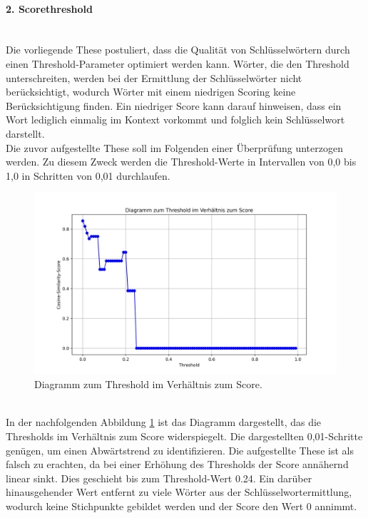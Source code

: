 \paragraph{2. Scorethreshold}\mbox{}\\
Die vorliegende These postuliert, dass die Qualität von Schlüsselwörtern durch einen Threshold-Parameter optimiert werden kann. Wörter, die den Threshold unterschreiten, werden bei der Ermittlung der Schlüsselwörter nicht berücksichtigt, wodurch Wörter mit einem niedrigen Scoring keine Berücksichtigung finden. Ein niedriger Score kann darauf hinweisen, dass ein Wort lediglich einmalig im Kontext vorkommt und folglich kein Schlüsselwort darstellt.\\

Die zuvor aufgestellte These soll im Folgenden einer Überprüfung unterzogen werden. Zu diesem Zweck werden die Threshold-Werte in Intervallen von 0,0 bis 1,0 in Schritten von 0,01 durchlaufen.
\begin{figure}[H]
	\centering  
	\includegraphics[width=\linewidth]{plot/e2-threshold-score.png}
	\caption{Diagramm zum Threshold im Verhältnis zum Score.}
	\label{fig:thresholdvsscore}
\end{figure}\mbox{} \\
In der nachfolgenden Abbildung \ref{fig:thresholdvsscore} ist das Diagramm dargestellt, das die Thresholds im Verhältnis zum Score widerspiegelt. Die dargestellten 0,01-Schritte genügen, um einen Abwärtstrend zu identifizieren. Die aufgestellte These ist als falsch zu erachten, da bei einer Erhöhung des Thresholds der Score annähernd linear sinkt. Dies geschieht bis zum Threshold-Wert 0.24. Ein darüber hinausgehender Wert entfernt zu viele Wörter aus der Schlüsselwortermittlung, wodurch keine Stichpunkte gebildet werden und der Score den Wert 0 annimmt.\\

